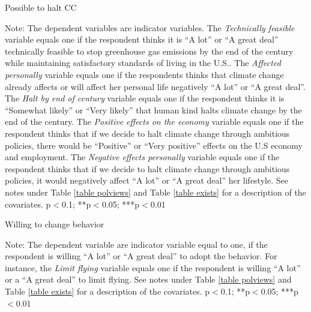 \documentclass{article}
\begin{document}
\begin{landscape}
	\begin{table}[h!]
		\caption{Possible to halt CC}
		\begin{center}
			\scalebox{0.55}{}
		\end{center}
	{\scriptsize Note: The dependent variables are indicator variables. The \textit{Technically feasible} variable equals one if the respondent thinks it is ``A lot'' or ``A great deal'' technically feasible to stop greenhouse gas emissions by the end of the century while maintaining satisfactory standards of living in the U.S.. The \textit{Affected personally} variable equals one if the respondents thinks that climate change already affects or will affect her personal life negatively ``A lot'' or ``A great deal''. The \textit{Halt by end of century} variable equals one if the respondent thinks it is ``Somewhat likely'' or ``Very likely'' that human kind halts climate change by the end of the century. The \textit{Positive effects on the economy} variable equals one if the respondent thinks that if we decide to halt climate change through ambitious policies, there would be ``Positive'' or ``Very positive'' effects on the U.S economy and employment. The \textit{Negative effects personally} variable equals one if the respondent thinks that if we decide to halt climate change through ambitious policies, it would negatively affect ``A lot'' or ``A great deal'' her lifestyle. See notes under Table \ref{table polviews} and Table \ref{table exists} for a description of the covariates.
	\newline *p$<$0.1; **p$<$0.05; ***p$<$0.01}
	\end{table}		
\end{landscape}

\begin{table}[h!]
	\caption{Willing to change behavior}
	\begin{center}
		\scalebox{0.7}{}
	\end{center}
	{\footnotesize Note: The dependent variable are indicator variable equal to one, if the respondent is willing ``A lot'' or ``A great deal'' to adopt the behavior. For instance, the \textit{Limit flying} variable equals one if the respondent is willing ``A lot'' or a ``A great deal'' to limit flying. See notes under Table \ref{table polviews} and Table \ref{table exists} for a description of the covariates.
	\newline *p$<$0.1; **p$<$0.05; ***p$<$0.01}
\end{table}		
\end{document}
